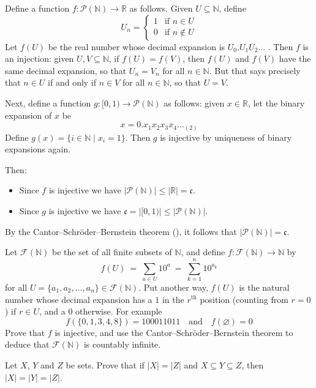 \begin{cproof}
Define a function $f : \mathcal{P}(\mathbb{N}) \to \mathbb{R}$ as follows. Given $U \subseteq \mathbb{N}$, define
\[ U_n = \begin{cases} 1 & \text{if $n \in U$} \\ 0 & \text{if $n \not\in U$} \end{cases} \]
Let $f(U)$ be the real number whose decimal expansion is $U_0.U_1U_2\dots$ . Then $f$ is an injection: given $U, V \subseteq \mathbb{N}$, if $f(U) = f(V)$, then $f(U)$ and $f(V)$ have the same decimal expansion, so that $U_n = V_n$ for all $n \in \mathbb{N}$. But that says precisely that $n \in U$ if and only if $n \in V$ for all $n \in \mathbb{N}$, so that $U=V$.

Next, define a function $g : [0,1) \to \mathcal{P}(\mathbb{N})$ as follows: given $x \in \mathbb{R}$, let the binary expansion of $x$ be
\[ x = 0.x_1x_2x_3x_4\dots{}_{(2)} \]
Define $g(x) = \{ i \in \mathbb{N} \mid x_i = 1 \}$. Then $g$ is injective by uniqueness of binary expansions again.

Then:
\begin{itemize}
\item Since $f$ is injective we have $|\mathcal{P}(\mathbb{N})| \le |\mathbb{R}| = \mathfrak{c}$.
\item Since $g$ is injective we have $\mathfrak{c} = |[0,1)| \le |\mathcal{P}(\mathbb{N})|$.
\end{itemize}

By the Cantor--Schr\"{o}der--Bernstein theorem (), it follows that $|\mathcal{P}(\mathbb{N})| = \mathfrak{c}$.
\end{cproof}

\begin{exercise}
Let $\mathcal{F}(\mathbb{N})$ be the set of all finite subsets of $\mathbb{N}$, and define $f : \mathcal{F}(\mathbb{N}) \to \mathbb{N}$ by
\[ f(U) ~=~ \sum_{a \in U} 10^a ~=~ \sum_{k = 1}^n 10^{a_k} \]
for all $U = \{ a_1, a_2, \dots, a_n \} \in \mathcal{F}(\mathbb{N})$. Put another way, $f(U)$ is the natural number whose decimal expansion has a $1$ in the $r^{\text{th}}$ position (counting from $r=0$) if $r \in U$, and a $0$ otherwise. For example
\[ f(\{ 0, 1, 3, 4, 8 \}) = 100011011 \quad \text{and} \quad f(\varnothing) = 0 \]
Prove that $f$ is injective, and use the Cantor--Schr\"{o}der--Bernstein theorem to deduce that $\mathcal{F}(\mathbb{N})$ is countably infinite.
\end{exercise}

\begin{exercise}
Let $X$, $Y$ and $Z$ be sets. Prove that if $|X| = |Z|$ and $X \subseteq Y \subseteq Z$, then $|X| = |Y| = |Z|$.
\end{exercise}